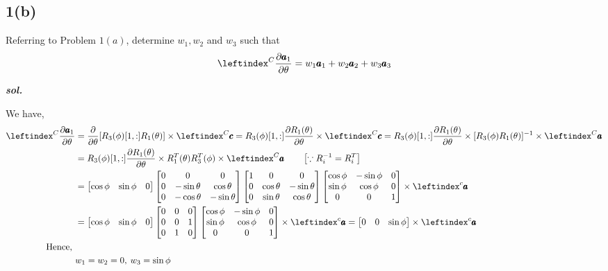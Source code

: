 \subsection{1(b)}
Referring to Problem $1(a)$, determine $w_1, w_2$ and  $w_3$ such that
$$ \lx{^C}{\frac{\partial \pmb a_1}{\partial \theta}} = w_1 \pmb a_1 + w_2 \pmb a_2 + w_3 \pmb a_3$$

\textbf{\textit{sol.}}

We have,
\begin{align*}
    \lx{^C}{\frac{\partial \pmb a_1}{\partial \theta}}  &=
    \frac{\partial}{\partial \theta} [R_3(\phi)[1,:]R_1(\theta)] \times \lx{^C}{\pmb c}
    = R_3(\phi)[1,:] \frac{\partial R_1(\theta)}{\partial \theta} \times \lx{^C}{\pmb c}
    = R_3(\phi)[1,:] \frac{\partial R_1(\theta)}{\partial \theta} \times [R_3(\phi)R_1(\theta)]^{-1} \times \lx{^C}{\pmb a}\\
    &=R_3(\phi)[1,:] \frac{\partial R_1(\theta)}{\partial \theta} \times R_1^T(\theta) R_3^T(\phi)\times \lx{^C}{\pmb a}
    \qquad \left[ \because R_i^{-1} = R_i^T \right]\\
    &= \bm{\cos \phi & \sin \phi  & 0}
    \bm{
            0 & 0 & 0\\
            0 & -\sin \theta & \cos \theta\\
            0 & -\cos \theta & -\sin \theta
        }
    \bm{
            1 & 0 & 0\\
            0 & \cos \theta & -\sin \theta\\
            0 & \sin \theta & \cos \theta
    }
    \bm{
            \cos \phi & -\sin \phi  & 0\\
            \sin \phi & \cos \phi & 0\\
            0          & 0         & 1
        }
    \times \lx{^c}{\pmb a}\\
    &= \bm{\cos \phi & \sin \phi  & 0}
    \bm{
            0 & 0 & 0\\
            0 & 0 & 1\\
            0 & 1 & 0
        }
    \bm{
            \cos \phi & -\sin \phi  & 0\\
            \sin \phi & \cos \phi & 0\\
            0          & 0         & 1
        }
    \times \lx{^c}{\pmb a}
    = \bm{0 & 0 & \sin \phi} \times \lx{^c}{\pmb a}\\
    \text{Hence, }&\\
    & w_1 = w_2 = 0, \: w_3 = \sin \phi
\end{align*}
